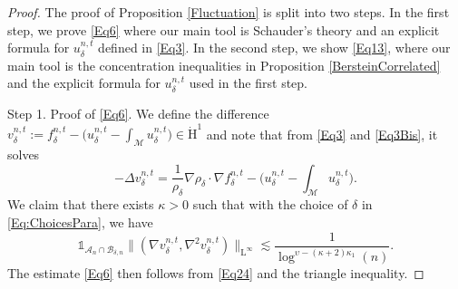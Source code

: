 \documentclass[11pt,a4paper,oneside]{amsart}
\numberwithin{equation}{section}
\newcommand{\LL}{\mathrm{L}}
\begin{document}
\begin{proof}
%
The proof of Proposition \ref{Fluctuation} is split into two steps. In the first step, we prove \eqref{Eq6} where our main tool is Schauder's theory and an explicit formula for $u^{n,t}_{\delta}$ defined in \eqref{Eq3}. In the second step, we show \eqref{Eq13}, where our main tool is the concentration inequalities in Proposition \ref{BersteinCorrelated} and the explicit formula for $u^{n,t}_{\delta}$ used in the first step.

%
\medskip
%

{\sc Step 1. Proof of \eqref{Eq6}. }We define the difference $v^{n,t}_{\delta}:=f^{n,t}_\delta-\Big(u^{n,t}_{\delta}-\int_{\mathcal{M}} u^{n,t}_\delta\Big)\in \dot{\text{H}}^1$ and note that from \eqref{Eq3} and \eqref{Eq3Bis}, it solves
%
\begin{equation}\label{Eq5}
%
 -\Delta v^{n,t}_{\delta}=\frac{1}{\rho_{\delta}}\nabla\rho_\delta\cdot\nabla f^{n,t}_\delta-\Big(u^{n,t}_{\delta}-\int_{\mathcal{M}}u^{n,t}_\delta\Big).
\end{equation}
%
We claim that there exists $\kappa>0$ such that with the choice of $\delta$ in \eqref{Eq:ChoicesPara}, we have
%
\begin{equation}\label{Eq24}
\mathds{1}_{\mathcal{A}_n\cap\mathcal{B}_{\delta,n}}\big\|(\nabla v^{n,t}_{\delta},\nabla^2 v^{n,t}_{\delta})\big\|_{\LL^{\infty}}\lesssim \frac{1}{\log^{\upsilon-(\kappa+2)\kappa_1}(n)}.
\end{equation}
%
The estimate \eqref{Eq6} then follows from \eqref{Eq24} and the triangle inequality. 

%
\medskip
%


\end{proof}
\end{document}
